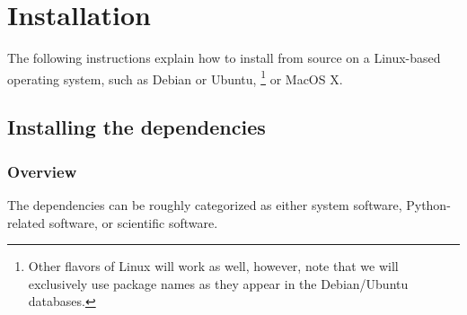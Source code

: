 \chapter{Installation}

The following instructions explain how to install \EOS from source on a 
Linux-based operating system, such as Debian
or Ubuntu, \footnote{%
    Other flavors of Linux will work as well, however, note that
    we will exclusively use package names as they appear in the Debian/Ubuntu
     databases.
}
or MacOS X.

\section{Installing the dependencies}

\subsection{Overview}
\label{sec:inst:depend:overview}

The dependencies can be roughly categorized as either system software, Python-related
software, or scientific software.\\


